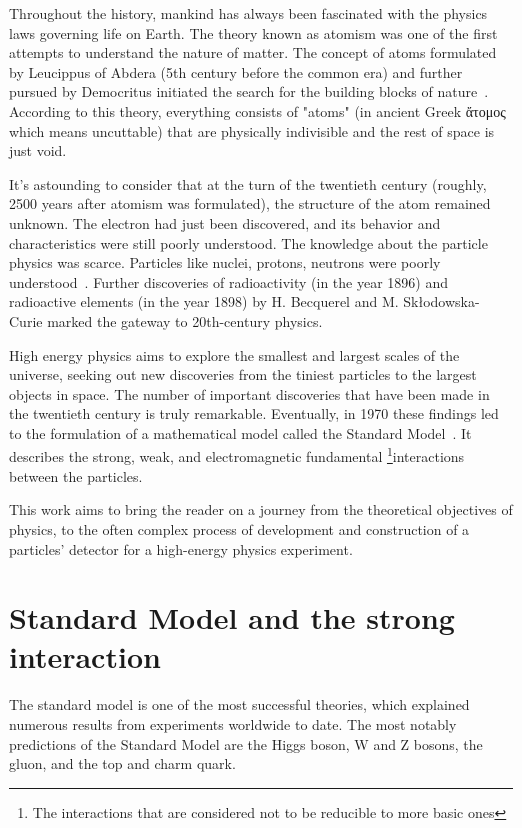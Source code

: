 Throughout the history, mankind has always been fascinated with the physics laws governing life on Earth. The theory known as atomism was one of the first attempts to understand the nature of matter. The concept of atoms formulated by Leucippus of Abdera (5th century before the common era) and further pursued by Democritus initiated the search for the building blocks of nature~\cite{sep-atomism-ancient}. According to this theory, everything consists of "atoms" (in ancient Greek \foreignlanguage{greek}{ἄτομος} which means uncuttable) that are physically indivisible and the rest of space is just void. 

It's astounding to consider that at the turn of the twentieth century (roughly, 2500 years after atomism was formulated), the structure of the atom remained unknown. The electron had just been discovered, and its behavior and characteristics were still poorly understood. The knowledge about the particle physics was scarce. Particles like nuclei, protons, neutrons were poorly understood~\cite{intro_particle_physics}. 
Further discoveries of radioactivity (in the year 1896) and radioactive elements (in the year 1898) by H. Becquerel and M. Skłodowska-Curie marked the gateway to 20th-century physics. 

High energy physics aims to explore the smallest and largest scales of the universe, seeking out new discoveries from the tiniest particles to the largest objects in space.
The number of important discoveries that have been made in the twentieth century is truly remarkable. Eventually, in 1970 these findings led to the formulation of a mathematical model called the Standard Model~\cite{intro_particle_physics}.  It describes the strong, weak, and electromagnetic fundamental \footnote{The interactions that are considered not to be reducible to more basic ones}{interactions} between the particles. 
 
 
 This work aims to bring the reader on a journey from the theoretical objectives of physics, to the often complex process of development and construction of a particles' detector for a high-energy physics experiment.
 
\section{Standard Model and the strong interaction}

The standard model is one of the most successful theories, which explained numerous results from experiments worldwide to date. The most notably predictions of the Standard Model are the Higgs boson, W and Z bosons, the gluon, and the top and charm quark.

